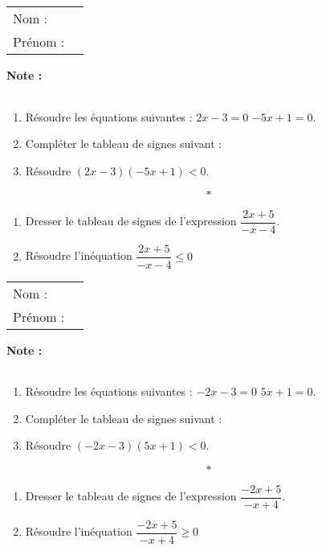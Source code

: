 \documentclass[10pt,french]{book}
\newcommand\presentation{
\setcounter{exo}{0}
    \begin{tabular}{ll}
        Nom : \\[5pt]
        Prénom :
    \end{tabular}
\hfill
    \textbf{Note :}
        \renewcommand\arraystretch{2.3}
    \begin{tabular}{|c|}
        \hline
            \slashbox{\Huge\bfseries\phantom{10}}{\Huge\bfseries 10}\\
        \hline
    \end{tabular}
        \renewcommand\arraystretch{1.5}\par\vspace*{1cm}
    \hrulefill
}
\begin{document}

\presentation

\exo 
\begin{enumerate}
    \item Résoudre les équations suivantes : \quad $2x - 3 = 0$ \qetq $-5x + 1 = 0$.\vspace*{5cm}
    \item Compléter le tableau de signes suivant :
    \begin{center}
    \end{center}
    \item Résoudre $(2x - 3)(-5x + 1) < 0$.\vspace*{2cm}
\end{enumerate}\[*\]

\exo
\begin{enumerate}
    \item Dresser le tableau de signes de l'expression $\dfrac{2x + 5}{-x - 4}$.
    \item Résoudre l'inéquation $\dfrac{2x + 5}{-x - 4} \leqslant 0$
\end{enumerate}

\clearpage


\setcounter{exo}{0}

\presentation

\exo
\begin{enumerate}
    \item Résoudre les équations suivantes : \quad $-2x - 3 = 0$ \qetq $5x + 1 = 0$.\vspace*{5cm}
    \item Compléter le tableau de signes suivant :
    \begin{center}
    \end{center}
    \item Résoudre $(-2x - 3)(5x + 1) < 0$.\vspace*{2cm}
\end{enumerate}\[*\]

\exo
\begin{enumerate}
    \item Dresser le tableau de signes de l'expression $\dfrac{-2x + 5}{-x + 4}$.
    \item Résoudre l'inéquation $\dfrac{-2x + 5}{-x + 4} \geqslant 0$
\end{enumerate}
\end{document}
